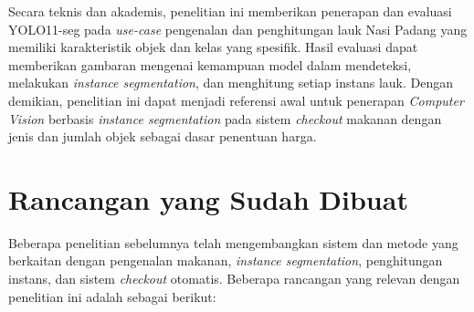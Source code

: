 Secara teknis dan akademis, penelitian ini memberikan penerapan dan evaluasi YOLO11-seg pada \textit{use-case} pengenalan dan penghitungan lauk Nasi Padang yang memiliki karakteristik objek dan kelas yang spesifik. Hasil evaluasi dapat memberikan gambaran mengenai kemampuan model dalam mendeteksi, melakukan \textit{instance segmentation}, dan menghitung setiap instans lauk. Dengan demikian, penelitian ini dapat menjadi referensi awal untuk penerapan \textit{Computer Vision} berbasis \textit{instance segmentation} pada sistem \textit{checkout} makanan dengan jenis dan jumlah objek sebagai dasar penentuan harga.

\section{Rancangan yang Sudah Dibuat}

Beberapa penelitian sebelumnya telah mengembangkan sistem dan metode yang berkaitan dengan pengenalan makanan, \textit{instance segmentation}, penghitungan instans, dan sistem \textit{checkout} otomatis. Beberapa rancangan yang relevan dengan penelitian ini adalah sebagai berikut:

